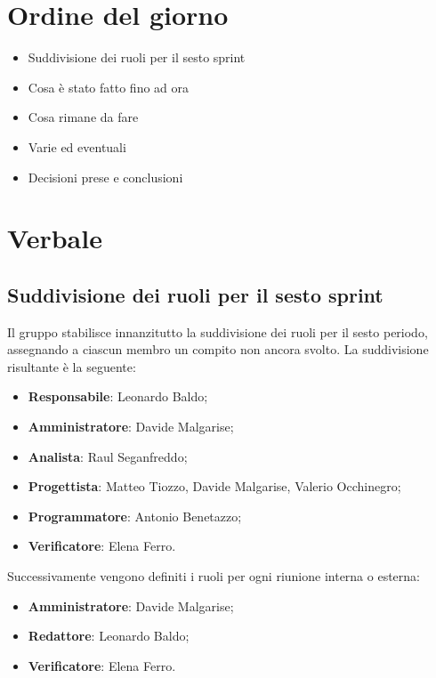 \documentclass[italian,12pt]{article}
\begin{document}
\section{Ordine del giorno}
\begin{itemize}
	\item Suddivisione dei ruoli per il sesto sprint
	\item Cosa è stato fatto fino ad ora
	\item Cosa rimane da fare
	\item Varie ed eventuali
	\item Decisioni prese e conclusioni
\end{itemize}

\newpage

\section{Verbale}
\subsection{Suddivisione dei ruoli per il sesto sprint}
Il gruppo stabilisce innanzitutto la suddivisione dei ruoli per il sesto periodo, assegnando a ciascun membro un compito non ancora svolto. La suddivisione risultante è la seguente:
\begin{itemize}
	\item \textbf{Responsabile}: Leonardo Baldo;
	\item \textbf{Amministratore}: Davide Malgarise;
	\item \textbf{Analista}: Raul Seganfreddo;
	\item \textbf{Progettista}: Matteo Tiozzo, Davide Malgarise, Valerio Occhinegro;
	\item \textbf{Programmatore}: Antonio Benetazzo;
	\item \textbf{Verificatore}: Elena Ferro.
\end{itemize}
Successivamente vengono definiti i ruoli per ogni riunione interna o esterna:
\begin{itemize}
	\item \textbf{Amministratore}: Davide Malgarise;
	\item \textbf{Redattore}: Leonardo Baldo;
	\item \textbf{Verificatore}: Elena Ferro.
\end{itemize}
\end{document}
